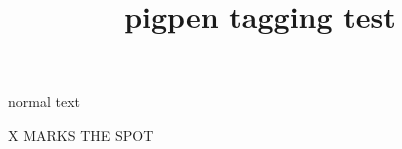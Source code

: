 \documentclass{article}
\title{pigpen tagging test}
\begin{document}
normal text

{\pigpenfont X MARKS THE SPOT} %
\end{document}
